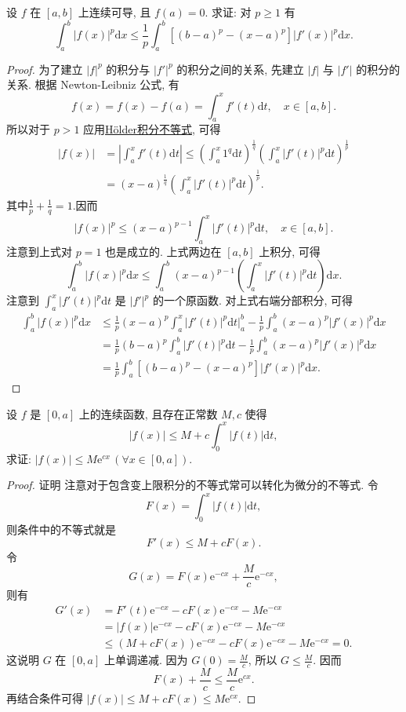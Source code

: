 \documentclass[../../main.tex]{subfiles}%
\begin{document}
\begin{example}
设 $f$ 在 $[a,b]$ 上连续可导, 且 $f(a)=0$. 求证: 对 $p\geqslant 1$ 有
$$\int_a^b|f(x)|^p\mathrm{d}x\leqslant \frac{1}{p}\int_a^b\left[(b-a)^p-(x-a)^p\right]|f'(x)|^p\mathrm{d}x.$$
\end{example}
\begin{proof}
为了建立 $|f|^p$ 的积分与 $|f'|^p$ 的积分之间的关系, 先建立 $|f|$ 与 $|f'|$ 的积分的关系. 根据 Newton-Leibniz 公式, 有
$$f(x)=f(x)-f(a)=\int_a^x f'(t)\mathrm{d}t,\quad x\in[a,b].$$
所以对于 $p>1$ 应用\hyperref[theorem:Hölder(H\"older)不等式(积分形式)]{Hölder积分不等式}, 可得
$$
\begin{aligned}
|f(x)| &= \left|\int_a^x f'(t)\mathrm{d}t\right|\leqslant  \left(\int_a^x 1^q\mathrm{d}t\right)^{\frac{1}{q}} \left(\int_a^x |f'(t)|^p\mathrm{d}t\right)^{\frac{1}{p}} \\
&= (x-a)^{\frac{1}{q}} \left(\int_a^x |f'(t)|^p\mathrm{d}t\right)^{\frac{1}{p}}.
\end{aligned}
$$
其中$\frac{1}{p}+\frac{1}{q}=1$.因而
$$|f(x)|^p\leqslant (x-a)^{p-1}\int_a^x |f'(t)|^p\mathrm{d}t,\quad x\in[a,b].$$
注意到上式对 $p=1$ 也是成立的. 上式两边在 $[a,b]$ 上积分, 可得
$$\int_a^b|f(x)|^p\mathrm{d}x\leqslant \int_a^b(x-a)^{p-1}\left(\int_a^x |f'(t)|^p\mathrm{d}t\right)\mathrm{d}x.$$
注意到 $\int_a^x |f'(t)|^p\mathrm{d}t$ 是 $|f'|^p$ 的一个原函数. 对上式右端分部积分, 可得
$$
\begin{aligned}
\int_a^b|f(x)|^p\mathrm{d}x &\leqslant  \frac{1}{p}(x-a)^p\int_a^x |f'(t)|^p\mathrm{d}t\bigg|_a^b - \frac{1}{p}\int_a^b(x-a)^p|f'(x)|^p\mathrm{d}x \\
&= \frac{1}{p}(b-a)^p\int_a^b |f'(t)|^p\mathrm{d}t - \frac{1}{p}\int_a^b(x-a)^p|f'(x)|^p\mathrm{d}x \\
&= \frac{1}{p}\int_a^b\left[(b-a)^p-(x-a)^p\right]|f'(x)|^p\mathrm{d}x.
\end{aligned}
$$
\end{proof}

\begin{example}
设 $f$ 是 $[0,a]$ 上的连续函数, 且存在正常数 $M,c$ 使得
$$|f(x)|\leqslant  M+c\int_0^x|f(t)|\mathrm{d}t,$$
求证: $|f(x)|\leqslant  M\mathrm{e}^{cx}\,(\forall x\in[0,a])$.
\end{example}
\begin{proof}
证明 注意对于包含变上限积分的不等式常可以转化为微分的不等式. 令
$$F(x)=\int_0^x|f(t)|\mathrm{d}t,$$
则条件中的不等式就是
$$F'(x)\leqslant  M+cF(x).$$
令
$$G(x)=F(x)\mathrm{e}^{-cx}+\frac{M}{c}\mathrm{e}^{-cx},$$
则有
$$
\begin{aligned}
G'(x) &= F'(t)\mathrm{e}^{-cx}-cF(x)\mathrm{e}^{-cx}-M\mathrm{e}^{-cx} \\
&= |f(x)|\mathrm{e}^{-cx}-cF(x)\mathrm{e}^{-cx}-M\mathrm{e}^{-cx} \\
&\leqslant  (M+cF(x))\mathrm{e}^{-cx}-cF(x)\mathrm{e}^{-cx}-M\mathrm{e}^{-cx}=0.
\end{aligned}
$$
这说明 $G$ 在 $[0,a]$ 上单调递减. 因为 $G(0)=\frac{M}{c}$, 所以 $G\leqslant \frac{M}{c}$. 因而
$$F(x)+\frac{M}{c}\leqslant \frac{M}{c}\mathrm{e}^{cx}.$$
再结合条件可得 $|f(x)|\leqslant  M+cF(x)\leqslant  M\mathrm{e}^{cx}$.
\end{proof}
\end{document}
